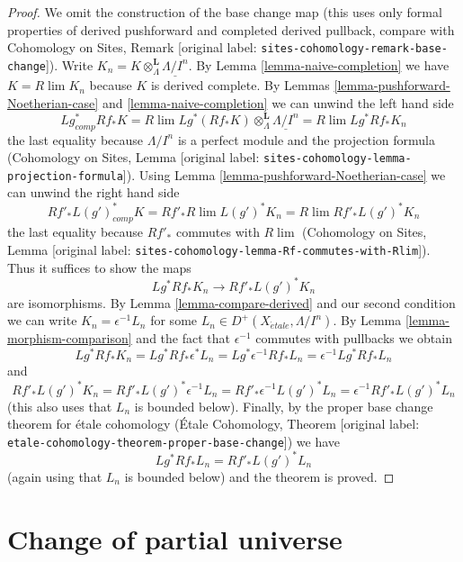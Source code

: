 \documentclass[10pt,a4paper]{article}
\theoremstyle{plain}
\theoremstyle{definition}
\theoremstyle{remark}
\numberwithin{equation}{subsection}
\def\lim{\mathop{\mathrm{lim}}\nolimits}
\def\etale{{\acute{e}tale}}
\begin{document}
\begin{proof}
We omit the construction of the base change map (this uses only
formal properties of derived pushforward and completed derived pullback,
compare with
Cohomology on Sites, Remark \textnormal{[original label: \nolinkurl{sites-cohomology-remark-base-change}]}).
Write $K_n = K \otimes^\mathbf{L}_\Lambda \underline{\Lambda/I^n}$.
By Lemma \ref{lemma-naive-completion} we have $K = R\lim K_n$
because $K$ is derived complete.
By Lemmas \ref{lemma-pushforward-Noetherian-case} and
\ref{lemma-naive-completion} we can unwind the left hand side
$$
Lg_{comp}^* Rf_* K =
R\lim Lg^*(Rf_*K)\otimes^\mathbf{L}_\Lambda \underline{\Lambda/I^n} =
R\lim Lg^* Rf_* K_n
$$
the last equality because $\Lambda/I^n$ is a perfect module and
the projection formula (Cohomology on Sites, Lemma
\textnormal{[original label: \nolinkurl{sites-cohomology-lemma-projection-formula}]}).
Using Lemma \ref{lemma-pushforward-Noetherian-case} we can unwind the right
hand side
$$
Rf'_* L(g')^*_{comp} K =
Rf'_* R\lim L(g')^* K_n  =
R\lim Rf'_* L(g')^* K_n
$$
the last equality because $Rf'_*$ commutes with $R\lim$
(Cohomology on Sites, Lemma
\textnormal{[original label: \nolinkurl{sites-cohomology-lemma-Rf-commutes-with-Rlim}]}).
Thus it suffices to show the maps
$$
Lg^* Rf_* K_n \longrightarrow Rf'_* L(g')^* K_n
$$
are isomorphisms. By Lemma \ref{lemma-compare-derived} and our second
condition we can write $K_n = \epsilon^{-1}L_n$ for some
$L_n \in D^+(X_\etale, \Lambda/I^n)$. By Lemma \ref{lemma-morphism-comparison}
and the fact that $\epsilon^{-1}$ commutes with pullbacks
we obtain
$$
Lg^* Rf_* K_n =
Lg^* Rf_* \epsilon^*L_n =
Lg^* \epsilon^{-1} Rf_* L_n =
\epsilon^{-1} Lg^* Rf_* L_n
$$
and
$$
Rf'_* L(g')^* K_n =
Rf'_* L(g')^* \epsilon^{-1} L_n =
Rf'_* \epsilon^{-1} L(g')^* L_n =
\epsilon^{-1} Rf'_* L(g')^* L_n
$$
(this also uses that $L_n$ is bounded below).
Finally, by the proper base change theorem for \'etale cohomology
(\'Etale Cohomology, Theorem
\textnormal{[original label: \nolinkurl{etale-cohomology-theorem-proper-base-change}]}) we have
$$
Lg^* Rf_* L_n = Rf'_* L(g')^* L_n
$$
(again using that $L_n$ is bounded below)
and the theorem is proved.
\end{proof}






\section{Change of partial universe}
\label{section-change-universe}
\end{document}
